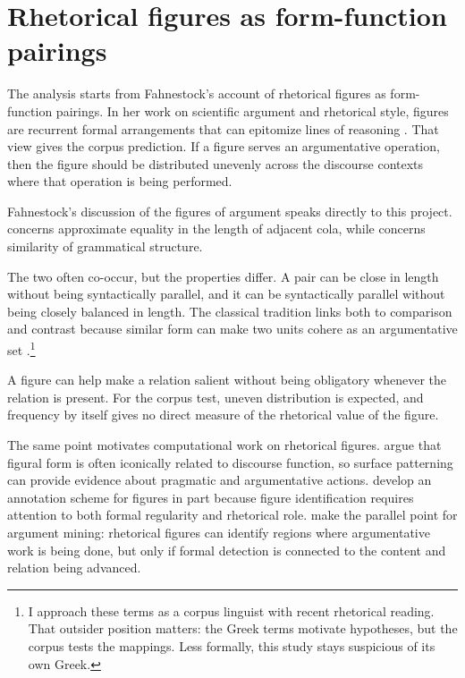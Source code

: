 \documentclass[12pt]{article}
\begin{document}
\section{Rhetorical figures as form-function pairings}

The analysis starts from Fahnestock's account of rhetorical
figures as form-function pairings. In her work on scientific argument and
rhetorical style, figures are recurrent formal arrangements that can
epitomize lines of
reasoning \citep{fahnestock1999RhetoricalFiguresScience,fahnestock2011RhetoricalStyle}.
That view gives the corpus prediction. If a figure
serves an argumentative operation, then the figure should be
distributed unevenly across the discourse contexts where that operation
is being performed.

Fahnestock's discussion of the figures of argument speaks directly to
this project.  concerns approximate equality in the
length of adjacent cola, while  concerns similarity of
grammatical structure.

The two often co-occur, but the properties differ.
A pair can be close in length without being syntactically
parallel, and it can be syntactically parallel without being closely
balanced in length. The classical tradition links both to comparison and
contrast because similar form can make two units cohere as an
argumentative set \citep{fahnestock2011RhetoricalStyle}.\footnote{I
approach these terms as a corpus linguist with recent rhetorical reading.
That outsider position matters: the Greek terms motivate hypotheses, but
the corpus tests the mappings. Less formally, this study stays suspicious of
its own Greek.}

A figure can help make a relation salient without being
obligatory whenever the relation is present. For the corpus test, uneven
distribution is expected, and frequency by itself gives no direct measure
of the rhetorical value of the figure.

The same point motivates computational work on rhetorical figures.
\textcite{harrisDimarco2017RhetoricalFiguresComputation} argue that
figural form is often iconically related to discourse function, so
surface patterning can provide evidence about pragmatic and argumentative
actions. \textcite{harrisEtAl2018AnnotationSchemeRhetoricalFigures}
develop an annotation scheme for figures in part because figure
identification requires attention to both formal regularity and
rhetorical role. \textcite{lawrenceEtAl2017HarnessingRhetoricalFigures}
make the parallel point for argument mining: rhetorical figures can
identify regions where argumentative work is being done, but only if
formal detection is connected to the content and relation being advanced.
\end{document}
